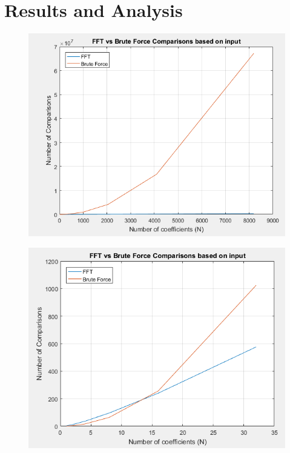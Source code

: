 \documentclass[12pt]{article}
\begin{document}
        \section{Results and Analysis} 
        \begin{figure}[H]
            \centerline{\includegraphics[scale=0.5]{images/BruteVSFFT_8192_Comparisons}}
        \end{figure}
        \begin{figure}[H]
            \centerline{\includegraphics[scale=0.5]{images/BruteVSFFT_ZoomIn_Comparisons}}
        \end{figure}
\end{document}
